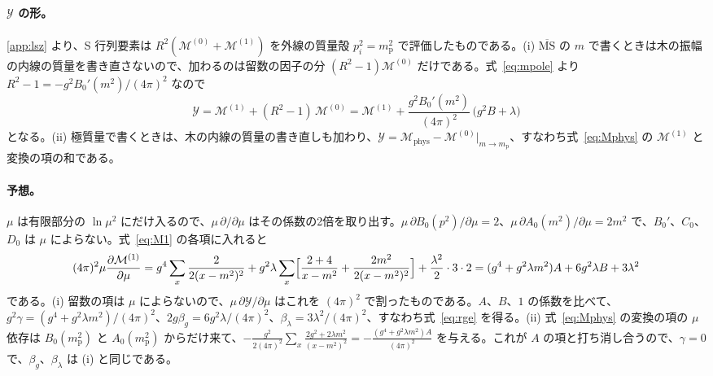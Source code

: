 \documentclass[a4paper,10pt]{ltjsarticle}
\begin{document}
\paragraph{$\mathcal{Y}$ の形。}\ref{app:lsz} より、S 行列要素は $R^2(\mathcal{M}^{(0)}+\mathcal{M}^{(1)})$ を外線の質量殻 $p_i^2=m_{\mathrm p}^2$ で評価したものである。(i) $\overline{\mathrm{MS}}$ の $m$ で書くときは木の振幅の内線の質量を書き直さないので、加わるのは留数の因子の分 $(R^2-1)\mathcal{M}^{(0)}$ だけである。式~\eqref{eq:mpole} より $R^2-1=-g^2B_0'(m^2)/(4\pi)^2$ なので
\begin{equation*}
\mathcal{Y}=\mathcal{M}^{(1)}+(R^2-1)\,\mathcal{M}^{(0)}=\mathcal{M}^{(1)}+\frac{g^2B_0'(m^2)}{(4\pi)^2}\,\bigl(g^2B+\lambda\bigr)
\end{equation*}
となる。(ii) 極質量で書くときは、木の内線の質量の書き直しも加わり、$\mathcal{Y}=\mathcal{M}_{\mathrm{phys}}-\mathcal{M}^{(0)}|_{m\to m_{\mathrm p}}$、すなわち式~\eqref{eq:Mphys} の $\mathcal{M}^{(1)}$ と変換の項の和である。

\paragraph{予想。}$\mu$ は有限部分の $\ln\mu^2$ にだけ入るので、$\mu\,\partial/\partial\mu$ はその係数の2倍を取り出す。$\mu\,\partial B_0(p^2)/\partial\mu=2$、$\mu\,\partial A_0(m^2)/\partial\mu=2m^2$ で、$B_0'$、$C_0$、$D_0$ は $\mu$ によらない。式~\eqref{eq:M1} の各項に入れると
\begin{equation*}
(4\pi)^2\mu\frac{\partial\mathcal{M}^{(1)}}{\partial\mu}
=g^4\sum_x\frac{2}{2(x-m^2)^2}+g^2\lambda\sum_x\Bigl[\frac{2+4}{x-m^2}+\frac{2m^2}{2(x-m^2)^2}\Bigr]+\frac{\lambda^2}{2}\cdot3\cdot2
=(g^4+g^2\lambda m^2)A+6g^2\lambda B+3\lambda^2
\end{equation*}
である。(i) 留数の項は $\mu$ によらないので、$\mu\,\partial \mathcal{Y}/\partial\mu$ はこれを $(4\pi)^2$ で割ったものである。$A$、$B$、$1$ の係数を比べて、$g^2\gamma=(g^4+g^2\lambda m^2)/(4\pi)^2$、$2g\beta_g=6g^2\lambda/(4\pi)^2$、$\beta_\lambda=3\lambda^2/(4\pi)^2$、すなわち式~\eqref{eq:rge} を得る。(ii) 式~\eqref{eq:Mphys} の変換の項の $\mu$ 依存は $B_0(m_{\mathrm p}^2)$ と $A_0(m_{\mathrm p}^2)$ からだけ来て、$-\frac{g^2}{2(4\pi)^2}\sum_x\frac{2g^2+2\lambda m^2}{(x-m^2)^2}=-\frac{(g^4+g^2\lambda m^2)A}{(4\pi)^2}$ を与える。これが $A$ の項と打ち消し合うので、$\gamma=0$ で、$\beta_g$、$\beta_\lambda$ は (i) と同じである。
\end{document}

